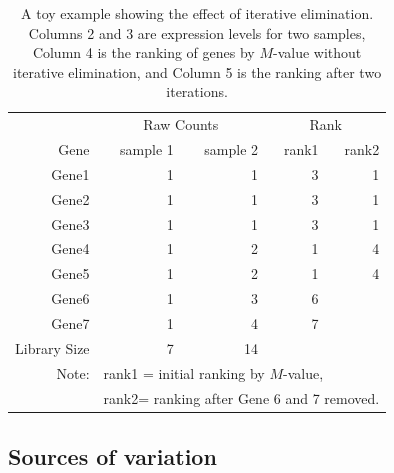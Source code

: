 \documentclass[11pt, a4paper]{article}
\begin{document}
 
\begin{table}[ht] \centering \caption{A toy example showing the effect of iterative elimination. Columns 2 and 3 are expression levels for two samples, Column 4 is the ranking of genes by $M$-value without iterative elimination, and Column 5 is the ranking after two iterations.} \begin{tabular}{rrrrr}
    \hline & \multicolumn{2}{c}{Raw Counts} & \multicolumn{2}{c}{Rank}\\
     Gene & sample 1 & sample 2 & rank1 & rank2 \\ \hline 
    Gene1 & 1 & 1 & 3 & 1 \\ 
    Gene2 & 1 & 1 & 3 & 1 \\ 
    Gene3 & 1 & 1 & 3 & 1 \\
     Gene4 & 1 & 2 & 1 & 4 \\ 
     Gene5 & 1 & 2 & 1 & 4 \\ 
     Gene6 & 1 & 3 & 6 &  \\ 
    Gene7 & 1 & 4 & 7 &  \\ \hline 
    Library Size & 7 & 14 & & 	\\ \hline 
    Note: &\multicolumn{4}{l}{ rank1 = initial ranking by $M$-value, } \\
    & \multicolumn{4}{l}{ rank2= ranking after Gene 6 and 7 removed.}
\end{tabular} \label{table:toyexample} \end{table}







\subsection{Sources of variation}\label{Section:varianceComp}
\end{document}
